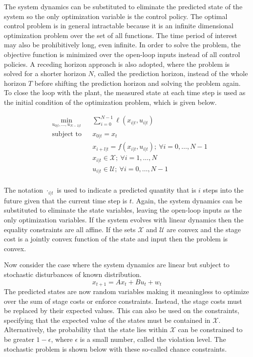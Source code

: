 \documentclass[12 pt]{report}
\begin{document}
The system dynamics can be substituted to eliminate the predicted state of the system so the only optimization variable is the control policy. The optimal control problem is in general intractable because it is an infinite dimensional optimization problem over the set of all functions. The time period of interest may also be prohibitively long, even infinite. In order to solve the problem, the objective function is minimized over the open-loop inputs instead of all control policies. A receding horizon approach is also adopted, where the problem is solved for a shorter horizon $N$, called the prediction horizon, instead of the whole horizon $T$ before shifting the prediction horizon and solving the problem again. To close the loop with the plant, the measured state at each time step is used as the initial condition of the optimization problem, which is given below.

\begin{equation*}
\begin{aligned}
& \min_{u_{0|t}, \dots, u_{N-1|t}} & & \sum_{i = 0}^{N-1} \ell (x_{i|t}, u_{i|t}) \\
& \text{subject to} & & x_{0|t} = x_t \\
& & & x_{i+l|t} = f(x_{i|t}, u_{i|t}); ~ \forall i = 0, \dots, N-1 \\
& & & x_{i|t} \in \mathcal{X}; ~ \forall i = 1, \dots, N \\
& & & u_{i|t} \in \mathcal{U}; ~ \forall i = 0, \dots, N-1 \\
\end{aligned}
\end{equation*}

The notation $\cdot_{i|t}$ is used to indicate a predicted quantity that is $i$ steps into the future given that the current time step is $t$. Again, the system dynamics can be substituted to eliminate the state variables, leaving the open-loop inputs as the only optimization variables. If the system evolves with linear dynamics then the equality constraints are all affine. If the sets $\mathcal{X}$ and $\mathcal{U}$ are convex and the stage cost is a jointly convex function of the state and input then the problem is convex.

Now consider the case where the system dynamics are linear but subject to stochastic disturbances of known distribution. $$ x_{t+1} = Ax_t + Bu_t + w_t $$ The predicted states are now random variables making it meaningless to optimize over the sum of stage costs or enforce constraints. Instead, the stage costs must be replaced by their expected values. This can also be used on the constraints, specifying that the expected value of the states must be contained in $\mathcal{X}$. Alternatively, the probability that the state lies within $\mathcal{X}$ can be constrained to be greater $1 - \epsilon$, where $\epsilon$ is a small number, called the violation level. The stochastic problem is shown below with these so-called chance constraints.
\end{document}
